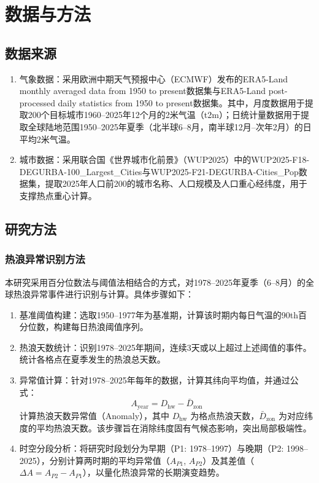 \documentclass[a4paper,UTF8,scheme=chinese,zihao=-4,twoside]{ctexart}
\makeatletter
\newcommand{\初号}{\zihao{0}}
\newcommand{\小初}{\zihao{-0}}
\newcommand{\一号}{\zihao{1}}
\newcommand{\小一}{\zihao{-1}}
\newcommand{\二号}{\zihao{2}}
\newcommand{\小二}{\zihao{-2}}
\newcommand{\三号}{\zihao{3}}
\newcommand{\小三}{\zihao{-3}}
\newcommand{\四号}{\zihao{4}}
\newcommand{\小四}{\zihao{-4}}
\newcommand{\五号}{\zihao{5}}
\newcommand{\小五}{\zihao{-5}}
\newcommand{\六号}{\zihao{6}}
\newcommand{\小六}{\zihao{-6}}
\newcommand{\七号}{\zihao{7}}
\newcommand{\八号}{\zihao{8}}
\newcommand{\宋体}{\songti}
\newcommand{\黑体}{\heiti}
\newcommand{\仿宋}{\fangsong}
\newcommand{\楷书}{\kaishu}
\newcommand{\粗体}{\bfseries}
\newcommand{\斜体}{\itshape}
\newcommand\下划线[2][6em]{\hskip1pt\underline{\hb@xt@ #1{\hss#2\hss}}\hskip3pt}
\makeatother
\begin{document}
\section{数据与方法}

\subsection{数据来源}

\begin{enumerate}[label=\arabic*、]
    \item 气象数据：采用欧洲中期天气预报中心（ECMWF）发布的ERA5-Land monthly averaged data from 1950 to present数据集与ERA5-Land post-processed daily statistics from 1950 to present数据集。其中，月度数据用于提取200个目标城市1960–2025年12个月的2米气温（t2m）；日统计量数据用于提取全球陆地范围1950–2025年夏季（北半球6–8月，南半球12月–次年2月）的日平均2米气温。
    \item 城市数据：采用联合国《世界城市化前景》（WUP2025）中的WUP2025-F18-DEGURBA-100\_Largest\_Cities与WUP2025-F21-DEGURBA-Cities\_Pop数据集，提取2025年人口前200的城市名称、人口规模及人口重心经纬度，用于支撑热点重心计算。
\end{enumerate}

\subsection{研究方法}

\subsubsection{热浪异常识别方法}

本研究采用百分位数法与阈值法相结合的方式，对1978–2025年夏季（6–8月）的全球热浪异常事件进行识别与计算。具体步骤如下：

\begin{enumerate}
    \item 基准阈值构建：选取1950–1977年为基准期，计算该时期内每日气温的90th百分位数，构建每日热浪阈值序列。
    \item 热浪天数统计：识别1978–2025年期间，连续3天或以上超过上述阈值的事件。统计各格点在夏季发生的热浪总天数。
    \item 异常值计算：针对1978–2025年每年的数据，计算其纬向平均值，并通过公式：
        \begin{equation}
        A_{\text{year}} = D_{\text{hw}} - \bar{D}_{\text{zon}}
        \end{equation}
        计算热浪天数异常值（Anomaly），其中 $D_{\text{hw}}$ 为格点热浪天数，$\bar{D}_{\text{zon}}$ 为对应纬度的平均热浪天数。该步骤旨在消除纬度固有气候态影响，突出局部极端性。
    \item 时空分段分析：将研究时段划分为早期（P1: 1978–1997）与晚期（P2: 1998–2025），分别计算两时期的平均异常值（$A_{P1}$, $A_{P2}$）及其差值（$\Delta A = A_{P2} - A_{P1}$），以量化热浪异常的长期演变趋势。
\end{enumerate}
\end{document}

